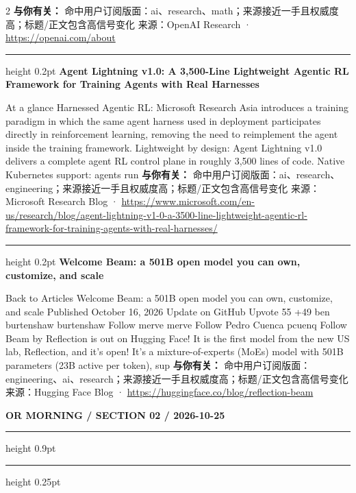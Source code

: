 \documentclass[10.5pt]{ctexart}
\begin{document}
\begin{multicols}{2}
\textbf{与你有关：} 命中用户订阅版面：ai、research、math；来源接近一手且权威度高；标题/正文包含高信号变化
{\footnotesize\color{ormuted} 来源：OpenAI Research · \url{https://openai.com/about}}
\vspace{2mm}
\hrule height 0.2pt
\vspace{2mm}
{\large\bfseries Agent Lightning v1.0: A 3,500-Line Lightweight Agentic RL Framework for Training Agents with Real Harnesses}\par
At a glance Harnessed Agentic RL: Microsoft Research Asia introduces a training paradigm in which the same agent harness used in deployment participates directly in reinforcement learning, removing the need to reimplement the agent inside the training framework. Lightweight by design: Agent Lightning v1.0 delivers a complete agent RL control plane in roughly 3,500 lines of code. Native Kubernetes support: agents run 
\textbf{与你有关：} 命中用户订阅版面：ai、research、engineering；来源接近一手且权威度高；标题/正文包含高信号变化
{\footnotesize\color{ormuted} 来源：Microsoft Research Blog · \url{https://www.microsoft.com/en-us/research/blog/agent-lightning-v1-0-a-3500-line-lightweight-agentic-rl-framework-for-training-agents-with-real-harnesses/}}
\vspace{2mm}
\hrule height 0.2pt
\vspace{2mm}
{\large\bfseries Welcome Beam: a 501B open model you can own, customize, and scale}\par
Back to Articles Welcome Beam: a 501B open model you can own, customize, and scale Published October 16, 2026 Update on GitHub Upvote 55 +49 ben burtenshaw burtenshaw Follow merve merve Follow Pedro Cuenca pcuenq Follow Beam by Reflection is out on Hugging Face! It is the first model from the new US lab, Reflection, and it’s open! It's a mixture-of-experts (MoEs) model with 501B parameters (23B active per token), sup
\textbf{与你有关：} 命中用户订阅版面：engineering、ai、research；来源接近一手且权威度高；标题/正文包含高信号变化
{\footnotesize\color{ormuted} 来源：Hugging Face Blog · \url{https://huggingface.co/blog/reflection-beam}}
\end{multicols}
\newpage
{\small\bfseries OR MORNING / SECTION 02 / 2026-10-25}
\vspace{2mm}
\hrule height 0.9pt
\vspace{1.5mm}
\hrule height 0.25pt
\vspace{4mm}
\end{document}
